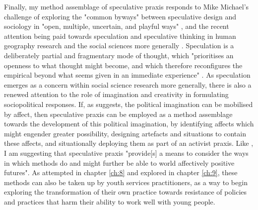 Finally, my method assemblage of speculative praxis responds to Mike Michael's challenge of exploring the "common byways" between speculative design and sociology in "open, multiple, uncertain, and playful ways" \citep[p. 177]{michael_-signing_2012}, and the recent attention being paid towards speculation and speculative thinking in human geography research and the social sciences more generally \citep[p. 1]{williams_abstract_2022}. Speculation is a deliberately partial and fragmentary mode of thought, which "prioritises an openness to what thought might become, and which therefore reconfigures the empirical beyond what seems given in an immediate experience" \citep[p. 2]{williams_abstract_2022}. As speculation emerges as a concern within social science research more generally, there is also a renewed attention to the role of imagination and creativity in formulating sociopolitical responses. If, as \citet{knox_affective_2017} suggests, the political imagination can be mobilised by affect, then speculative praxis can be employed as a method assemblage towards the development of this political imagination, by identifying affects which might engender greater possibility, designing artefacts and situations to contain these affects, and situationally deploying them as part of an activist praxis. Like \citep[p. 55]{coleman_glitterworlds_2020}, I am suggesting that speculative praxis "provide[s] a means to consider the ways in which methods do and might further be able to world affectively positive futures". As attempted in chapter \ref{ch:8} and explored in chapter \ref{ch:9}, these methods can also be taken up by youth services practitioners, as a way to begin exploring the transformation of their own practice towards resistance of policies and practices that harm their ability to work well with young people.

